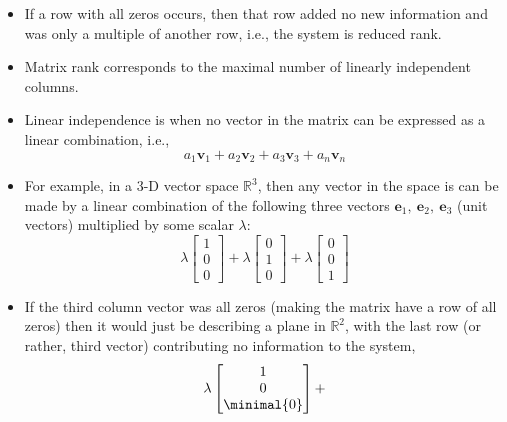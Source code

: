 \documentclass[basic]{inVerba-notes}
\begin{document}
\begin{enumerate}
  \begin{enumerate}
    \begin{itemize}
    \item If a row with all zeros occurs, then that row added no new information and was only a multiple of another row, i.e., the system is reduced rank. 
    \item Matrix rank corresponds to the maximal number of linearly independent columns. 
    \item Linear independence is when no vector in the matrix can be expressed as a linear combination, i.e., 
    \[%
    a_1\bm{v}_1 +  a_2\bm{v}_2 +  a_3\bm{v}_3 +  a_n\bm{v}_n   
    \]%
    \item For example, in a 3-D vector space \(\mathbb{R}^3\), then any vector in the space is can be made by a linear combination of the following three vectors \(\bm{e}_1,~\bm{e}_2,~\bm{e}_3\) (unit vectors) multiplied by some scalar \(\lambda \):
    \[%
    \lambda\begin{bmatrix} 1 \\ 0 \\ 0 \end{bmatrix} +
    \lambda\begin{bmatrix} 0 \\ 1 \\ 0 \end{bmatrix} + 
    \lambda\begin{bmatrix} 0 \\ 0 \\ 1 \end{bmatrix}
    \]%
    \item If the third column vector was all zeros (making the matrix have a row of all zeros) then it would just be describing a plane in \(\mathbb{R}^2\), with the last row (or rather, third vector) contributing no information to the system,
    \[%
    \lambda\begin{bmatrix} 1 \\ 0 \\ \minimal{0} \end{bmatrix} +
\]
\end{itemize}
\end{enumerate}
\end{enumerate}
\end{document}
